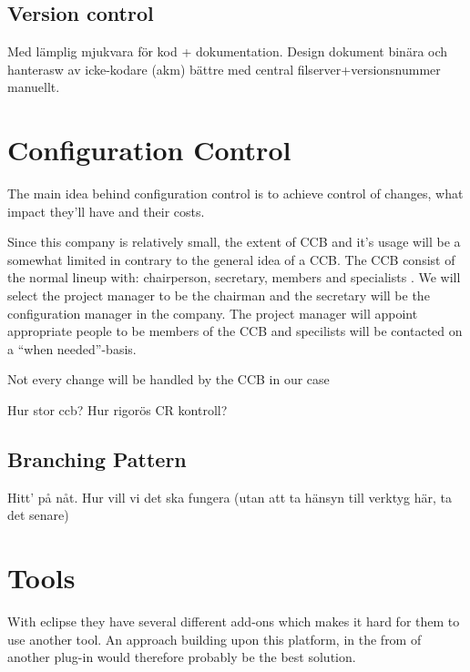 \documentclass[a4paper,10pt]{article}
\begin{document}
\subsection{Version control}
Med lämplig mjukvara för kod + dokumentation.
Design dokument binära och hanterasw av icke-kodare (akm) bättre med central filserver+versionsnummer manuellt.



\section{Configuration Control}

The main idea behind configuration control is to achieve control of changes, what impact they'll have and their costs.

Since this company is relatively small, the extent of CCB and it's usage will be a somewhat limited in contrary to the general idea of a CCB.
The CCB consist of the normal lineup with: chairperson, secretary, members and specialists \cite{daniels}. We will select the project manager
to be the chairman and the secretary will be the configuration manager in the company. The project manager will appoint appropriate people to be
members of the CCB and specilists will be contacted on a ``when needed''-basis.

Not every change will be handled by the CCB in our case



Hur stor ccb?
Hur rigorös CR kontroll?


\subsection{Branching Pattern}

Hitt' på nåt.
Hur vill vi det ska fungera (utan att ta hänsyn till verktyg här, ta det senare)

\section{Tools}
With eclipse they have several different add-ons which makes it hard for them to use another tool. An approach building upon this platform, in the from of another plug-in would therefore probably be the best solution.
\end{document}
